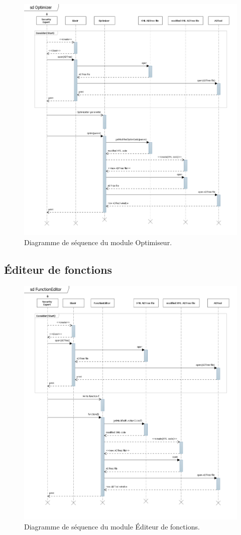 	    \begin{figure}[H]
	        \centering
	        \includegraphics[height=1\textwidth]{figure/Optim.png}
	        \caption{Diagramme de séquence du module Optimiseur.}
	        \label{fig:optim}
	    \end{figure}

	\subsection{Éditeur de fonctions}

	    \begin{figure}[H]
	        \centering
	        \includegraphics[height=1\textwidth]{figure/FunctionEditor.png}
	        \caption{Diagramme de séquence du module Éditeur de fonctions.}
	        \label{fig:function}
	    \end{figure}